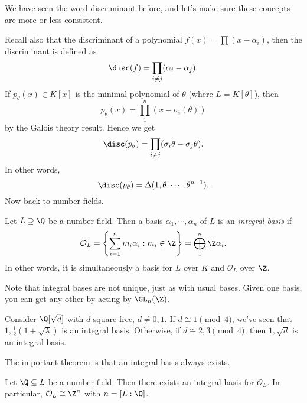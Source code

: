 \documentclass[a4paper]{article}
\begin{document}
We have seen the word discriminant before, and let's make sure these concepts are more-or-less consistent.

 Recall also that the discriminant of a polynomial $f(x) = \prod (x - \alpha_i)$, then the discriminant is defined as
\[
  \disc(f) = \prod_{i \not= j}(\alpha_i - \alpha_j).
\]
If $p_\theta(x) \in K[x]$ is the minimal polynomial of $\theta$ (where $L = K[\theta]$), then
\[
  p_\theta(x) = \prod_{1}^n (x - \sigma_i(\theta))
\]
by the Galois theory result. Hence we get
\[
  \disc(p_\theta) = \prod_{i \not= j}(\sigma_i \theta - \sigma_j \theta).
\]
In other words,
\[
  \disc(p_\theta) = \Delta(1, \theta, \cdots, \theta^{n - 1}).
\]
Now back to number fields.
\begin{defi}
  Let $L \supseteq \Q$ be a number field. Then a basis $\alpha_1, \cdots, \alpha_n$ of $L$ is an \emph{integral basis} if
  \[
    \mathcal{O}_L = \left\{\sum_{i = 1}^n m_i \alpha_i: m_i \in \Z\right\} = \bigoplus_1^n \Z\alpha_i.
  \]
  In other words, it is simultaneously a basis for $L$ over $K$ and $\mathcal{O}_L$ over $\Z$.
\end{defi}
Note that integral bases are not unique, just as with usual bases. Given one basis, you can get any other by acting by $\GL_n(\Z)$.

\begin{eg}
  Consider $\Q[\sqrt{d}]$ with $d$ square-free, $d \not= 0, 1$. If $d \cong 1\pmod 4$, we've seen that $1, \frac{1}{2}(1 + \sqrt{\lambda})$ is an integral basis. Otherwise, if $d \cong 2, 3 \pmod 4$, then $1, \sqrt{d}$ is an integral basis.
\end{eg}

The important theorem is that an integral basis always exists.

\begin{thm}
  Let $\Q \subseteq L$ be a number field. Then there exists an integral basis for $\mathcal{O}_L$. In particular, $\mathcal{O}_L \cong \Z^n$ with $n = [L:\Q]$.
\end{thm}
\end{document}
